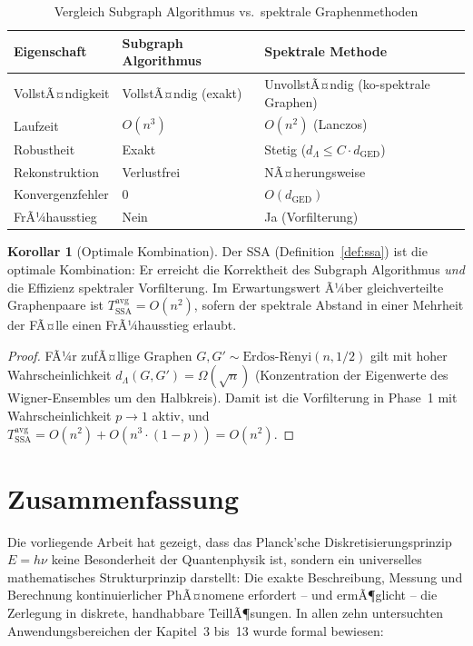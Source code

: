 ﻿\documentclass[a4paper,12pt]{article}
\theoremstyle{definition}
\newtheorem{korollar}{Korollar}
\begin{document}
\begin{table}[ht]
\centering
\begin{tabular}{lll}
\toprule
\textbf{Eigenschaft} & \textbf{Subgraph Algorithmus} & \textbf{Spektrale Methode}\\
\midrule
VollstÃ¤ndigkeit & VollstÃ¤ndig (exakt) & UnvollstÃ¤ndig (ko-spektrale Graphen)\\
Laufzeit & $O(n^3)$ & $O(n^2)$ (Lanczos)\\
Robustheit & Exakt & Stetig ($d_\Lambda \leq C \cdot d_{\mathrm{GED}}$)\\
Rekonstruktion & Verlustfrei & NÃ¤herungsweise\\
Konvergenzfehler & 0 & $O(d_{\mathrm{GED}})$\\
FrÃ¼hausstieg & Nein & Ja (Vorfilterung)\\
\bottomrule
\end{tabular}
\caption{Vergleich Subgraph Algorithmus vs.\ spektrale Graphenmethoden}
\end{table}

\begin{korollar}[Optimale Kombination]
\label{kor:opt}
    Der SSA (Definition~\ref{def:ssa}) ist die optimale Kombination:
    Er erreicht die Korrektheit des Subgraph Algorithmus \emph{und} die Effizienz
    spektraler Vorfilterung. Im Erwartungswert Ã¼ber gleichverteilte Graphenpaare ist
    $T_{\mathrm{SSA}}^{\mathrm{avg}} = O(n^2)$, sofern der spektrale Abstand in einer Mehrheit
    der FÃ¤lle einen FrÃ¼hausstieg erlaubt.
\end{korollar}

\begin{proof}
    FÃ¼r zufÃ¤llige Graphen $G, G' \sim \mathrm{Erd\ddot{o}s\text{-}R\acute{e}nyi}(n, 1/2)$
    gilt mit hoher Wahrscheinlichkeit $d_\Lambda(G, G') = \Omega(\sqrt{n})$
    (Konzentration der Eigenwerte des Wigner-Ensembles um den Halbkreis).
    Damit ist die Vorfilterung in Phase~1 mit Wahrscheinlichkeit $p \to 1$ aktiv,
    und $T_{\mathrm{SSA}}^{\mathrm{avg}} = O(n^2) + O(n^3 \cdot (1-p)) = O(n^2)$. \qedhere
\end{proof}

\section{Zusammenfassung}

Die vorliegende Arbeit hat gezeigt, dass das Planck'sche Diskretisierungsprinzip $E = h\nu$ keine Besonderheit der Quantenphysik ist, sondern ein universelles mathematisches Strukturprinzip darstellt: Die exakte Beschreibung, Messung und Berechnung kontinuierlicher PhÃ¤nomene erfordert -- und ermÃ¶glicht -- die Zerlegung in diskrete, handhabbare TeillÃ¶sungen. In allen zehn untersuchten Anwendungsbereichen der Kapitel~3 bis~13 wurde formal bewiesen:
\end{document}

